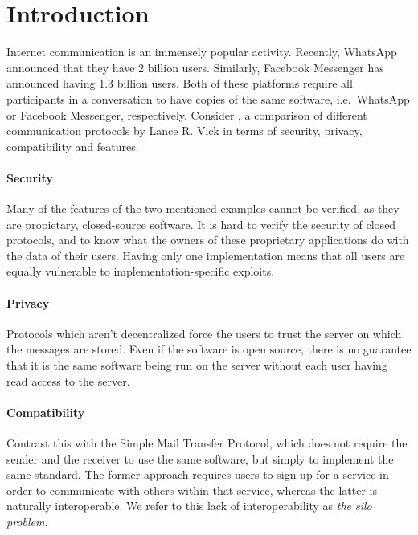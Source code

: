 \section{Introduction}
Internet communication is an immensely popular activity.
Recently, WhatsApp announced that they have 2 billion users\cite{whatsapp_2b_users_archive_org}.
Similarly, Facebook Messenger has announced having 1.3 billion users\cite{messenger_1pt3b_users}.
Both of these platforms require all participants in a conversation to have copies of the same software, i.e.~WhatsApp or Facebook Messenger, respectively.
Consider \cite{twitter_comms_protocol_comparison}, a comparison of different communication protocols by Lance R. Vick in terms of security, privacy, compatibility and features.
\paragraph{Security}
Many of the features of the two mentioned examples cannot be verified, as they are propietary, closed-source software.
It is hard to verify the security of closed protocols, and to know what the owners of these proprietary applications do with the data of their users.
Having only one implementation means that all users are equally vulnerable to implementation-specific exploits.
\paragraph{Privacy}
Protocols which aren't decentralized force the users to trust the server on which the messages are stored.
Even if the software is open source, there is no guarantee that it is the same software being run on the server without each user having read access to the server.
\paragraph{Compatibility}
Contrast this with the Simple Mail Transfer Protocol\cite{RFC5321}, which does not require the sender and the receiver to use the same software, but simply to implement the same standard.
The former approach requires users to sign up for a service in order to communicate with others within that service, whereas the latter is naturally interoperable.
We refer to this lack of interoperability as \textit{the silo problem}.


